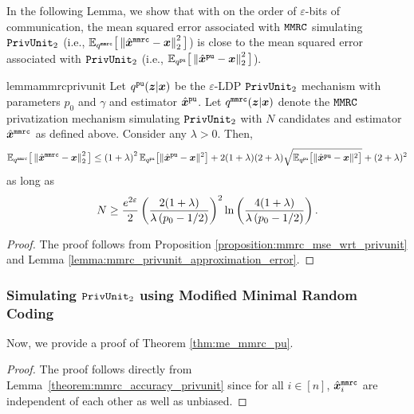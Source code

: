 In the following Lemma, we show that with on the order of $\varepsilon$-bits of communication, the mean squared error associated with $\texttt{MMRC}$ simulating $\texttt{PrivUnit}_2$ (i.e., $\mathbb{E}_{q^{\texttt{mmrc}}} \big[ \left\lVert  \hat{{\boldsymbol{x}}}^\texttt{mmrc} - {\boldsymbol{x}} \right\rVert^2_2  \big]$) is close to the mean squared error associated with $\texttt{PrivUnit}_2$ (i.e., $\mathbb{E}_{q^{\texttt{pu}}} \big[ \left\lVert  \hat{{\boldsymbol{x}}}^\texttt{pu} - {\boldsymbol{x}} \right\rVert^2_2  \big]$).
\begin{restatable}{lemma}{mmrcprivunit}\label{theorem:mmrc_accuracy_privunit}
Let $q^{\texttt{pu}}({\boldsymbol{z}} | {\boldsymbol{x}})$ be the  $\varepsilon$-LDP \emph{$\texttt{PrivUnit}_2$} mechanism with parameters $p_0$ and $\gamma$ and estimator $\hat{{\boldsymbol{x}}}^{\texttt{pu}}$. Let $q^{\texttt{mmrc}}({\boldsymbol{z}}|{\boldsymbol{x}})$ denote the \emph{$\texttt{MMRC}$} privatization mechanism simulating \emph{$\texttt{PrivUnit}_2$} with $N$ candidates and estimator $\hat{{\boldsymbol{x}}}^{\texttt{mmrc}}$ as defined above. 
Consider any $\lambda > 0$. Then,
\begin{align}
  \mathbb{E}_{q^{\texttt{mmrc}}} \big[ \left\lVert  \hat{{\boldsymbol{x}}}^\texttt{mmrc} - {\boldsymbol{x}} \right\rVert^2_2  \big] 
     \leq  \left( 1+\lambda \right)^2  \mathbb{E}_{q^{\texttt{pu}}}\big[\|\hat{{\boldsymbol{x}}}^{\texttt{pu}} - {\boldsymbol{x}}\|^2\big]  + 2(1+\lambda)(2+\lambda) \sqrt{\mathbb{E}_{q^{\texttt{pu}}}\big[\|\hat{{\boldsymbol{x}}}^{\texttt{pu}} - {\boldsymbol{x}}\|^2\big]} + (2+\lambda)^2
\end{align}
as long as 
\begin{align}
N \geq   \frac{e^{2\varepsilon}}{2}\left(\frac{2 (1+\lambda)}{\lambda \left( p_0 -1/2 \right)}\right)^2 \ln\left( \frac{4(1+\lambda)}{\lambda \left( p_0 -1/2 \right)} \right).
\end{align}
\end{restatable}
\begin{proof}
The proof follows from Proposition \ref{proposition:mmrc_mse_wrt_privunit} and Lemma \ref{lemma:mmrc_privunit_approximation_error}.
\end{proof}

\subsubsection{Simulating \texorpdfstring{$\texttt{PrivUnit}_2$}{PrivUnit} using Modified Minimal Random Coding}\label{appendix:mmrc_pu_ut}
Now, we provide a proof of Theorem \ref{thm:me_mmrc_pu}.
\mmrcpu*
\begin{proof}
The proof follows directly from Lemma~\ref{theorem:mmrc_accuracy_privunit} since for all $i \in [n]$, $\hat{{\boldsymbol{x}}}^{\texttt{mmrc}}_i$ are independent of each other as well as unbiased.
\end{proof}

